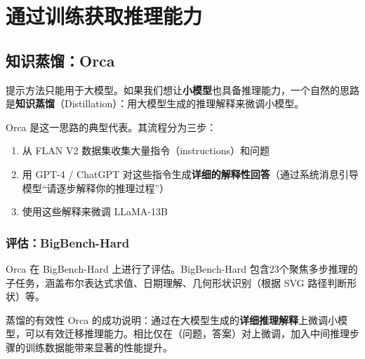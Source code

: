 \documentclass[a4paper]{article}
\begin{document}

\section{通过训练获取推理能力}

\subsection{知识蒸馏：Orca}

提示方法只能用于大模型。如果我们想让\textbf{小模型}也具备推理能力，一个自然的思路是\textbf{知识蒸馏}（Distillation）：用大模型生成的推理解释来微调小模型。

Orca 是这一思路的典型代表。其流程分为三步：

\begin{enumerate}
    \item 从 FLAN V2 数据集收集大量指令（instructions）和问题
    \item 用 GPT-4 / ChatGPT 对这些指令生成\textbf{详细的解释性回答}（通过系统消息引导模型``请逐步解释你的推理过程''）
    \item 使用这些解释来微调 LLaMA-13B
\end{enumerate}




\subsubsection{评估：BigBench-Hard}

Orca 在 BigBench-Hard 上进行了评估。BigBench-Hard 包含23个聚焦多步推理的子任务，涵盖布尔表达式求值、日期理解、几何形状识别（根据 SVG 路径判断形状）等。








\begin{importantbox}{蒸馏的有效性}
Orca 的成功说明：通过在大模型生成的\textbf{详细推理解释}上微调小模型，可以有效迁移推理能力。相比仅在（问题，答案）对上微调，加入中间推理步骤的训练数据能带来显著的性能提升。
\end{importantbox}
\end{document}
